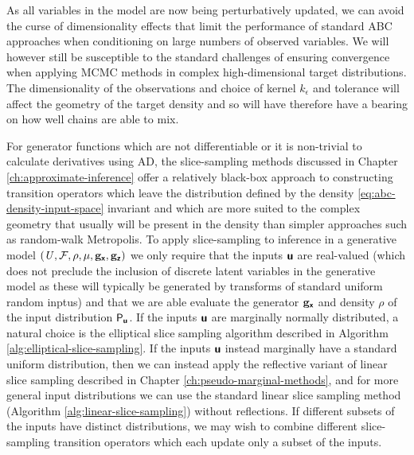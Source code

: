 As all variables in the model are now being perturbatively updated, we can avoid the curse of dimensionality effects that limit the performance of standard \ac{ABC} approaches when conditioning on large numbers of observed variables. We will however still be susceptible to the standard challenges of ensuring convergence when applying \ac{MCMC} methods in complex high-dimensional target distributions. The dimensionality of the observations and choice of kernel $k_\epsilon$ and tolerance will affect the geometry of the target density and so will have therefore have a bearing on how well chains are able to mix.

For generator functions which are not differentiable or it is non-trivial to calculate derivatives using \ac{AD}, the slice-sampling methods discussed in Chapter \ref{ch:approximate-inference} offer a relatively black-box approach to constructing transition operators which leave the distribution defined by the density \eqref{eq:abc-density-input-space} invariant and which are more suited to the complex geometry that usually will be present in the density than simpler approaches such as random-walk Metropolis. To apply slice-sampling to inference in a generative model $(\mathit{U},\mathcal{F}\kern-.2pt,\rho,\mu,{\mathbf{g}}_{\boldsymbol{\mathsf{x}}},{\mathbf{g}}_{\boldsymbol{\mathsf{z}}})$ we only require that the inputs $\boldsymbol{\mathsf{u}}$ are real-valued (which does not preclude the inclusion of discrete latent variables in the generative model as these will typically be generated by transforms of standard uniform random inptus) and that we are able evaluate the generator ${\mathbf{g}}_{\boldsymbol{\mathsf{x}}}$ and density $\rho$ of the input distribution $\mathsf{P}_{\boldsymbol{\mathsf{u}}}$. If the inputs $\boldsymbol{\mathsf{u}}$ are marginally normally distributed, a natural choice is the elliptical slice sampling algorithm described in Algorithm \ref{alg:elliptical-slice-sampling}. If the inputs $\boldsymbol{\mathsf{u}}$ instead marginally have a standard uniform distribution, then we can instead apply the reflective variant of linear slice sampling described in Chapter \ref{ch:pseudo-marginal-methods}, and for more general input distributions we can use the standard linear slice sampling method (Algorithm \ref{alg:linear-slice-sampling}) without reflections. If different subsets of the inputs have distinct distributions, we may wish to combine different slice-sampling transition operators which each update only a subset of the inputs.

